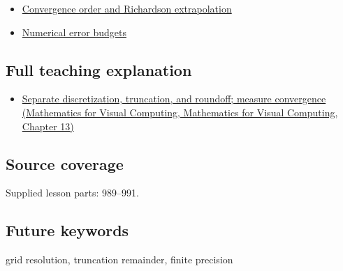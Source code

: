 \begin{itemize}
\tightlist
\item
  \hyperref[appendix-aca80b6bf17a]{Convergence order and Richardson extrapolation}
\item
  \hyperref[appendix-31b8c295e05f]{Numerical error budgets}
\end{itemize}

\subsection{Full teaching explanation}\label{appendix-6b0648b2b8e8-full-teaching-explanation}

\begin{itemize}
\tightlist
\item
  \href{../02-Mathematics-for-Visual-Computing/main.pdf\#nameddest=02-foundations-ii-ch029-separate-discretization-truncation-and-roundoff-measure-convergence}{Separate discretization, truncation, and roundoff; measure convergence (Mathematics for Visual Computing, Mathematics for Visual Computing, Chapter 13)}
\end{itemize}

\subsection{Source coverage}\label{appendix-6b0648b2b8e8-source-coverage}

Supplied lesson parts: 989--991.

\subsection{Future keywords}\label{appendix-6b0648b2b8e8-future-keywords}

grid resolution, truncation remainder, finite precision
